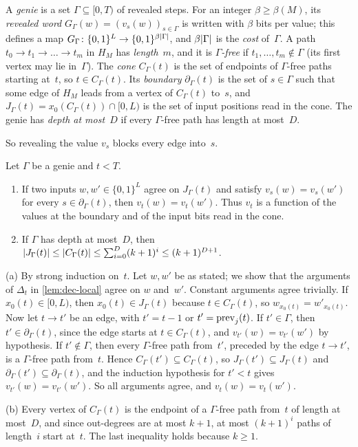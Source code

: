 \begin{definition}\label{def:genie}
A \emph{genie} is a set $\Gamma\subseteq[0,T)$ of revealed steps. For an integer $\beta\ge\beta(M)$, its
\emph{revealed word} $G_\Gamma(w)=(v_s(w))_{s\in\Gamma}$ is written with $\beta$ bits per value; this defines a map
$G_\Gamma\colon\{0,1\}^L\to\{0,1\}^{\beta\lvert \Gamma \rvert}$, and $\beta\lvert \Gamma \rvert$ is the \emph{cost} of~$\Gamma$. A path
$t_0\to t_1\to\dots\to t_m$ in $H_M$ has \emph{length}~$m$, and it is \emph{$\Gamma$-free} if
$t_1,\dots,t_m\notin\Gamma$ (its first vertex may lie in~$\Gamma$). The \emph{cone} $C_\Gamma(t)$ is the set of
endpoints of $\Gamma$-free paths starting at~$t$, so $t\in C_\Gamma(t)$. Its \emph{boundary} $\partial_\Gamma(t)$ is
the set of $s\in\Gamma$ such that some edge of $H_M$ leads from a vertex of $C_\Gamma(t)$ to~$s$, and
$J_\Gamma(t)=x_0(C_\Gamma(t))\cap[0,L)$ is the set of input positions read in the cone. The genie has \emph{depth at
most~$D$} if every $\Gamma$-free path has length at most~$D$.
\end{definition}

So revealing the value $v_s$ blocks every edge into~$s$.

\begin{lemma}\label{lem:cone}
\notformalized
Let $\Gamma$ be a genie and $t<T$.
\begin{enumerate}[label=(\alph*)]
\item If two inputs $w,w'\in\{0,1\}^L$ agree on $J_\Gamma(t)$ and satisfy $v_s(w)=v_s(w')$ for every
$s\in\partial_\Gamma(t)$, then $v_t(w)=v_t(w')$. Thus $v_t$ is a function of the values at the boundary and of the
input bits read in the cone.
\item If $\Gamma$ has depth at most~$D$, then
$\lvert J_\Gamma(t) \rvert\le\lvert C_\Gamma(t) \rvert\le\sum_{i=0}^{D}(k+1)^i\le(k+1)^{D+1}$.
\end{enumerate}
\end{lemma}

\begin{informalproof}
(a) By strong induction on~$t$. Let $w,w'$ be as stated; we show that the arguments of $\Delta_t$ in
\cref{lem:dec-local} agree on $w$ and~$w'$. Constant arguments agree trivially. If $x_0(t)\in[0,L)$, then
$x_0(t)\in J_\Gamma(t)$ because $t\in C_\Gamma(t)$, so $w_{x_0(t)}=w'_{x_0(t)}$. Now let $t\to t'$ be an edge, with
$t'=t-1$ or $t'=\mathrm{prev}_j(t)$. If $t'\in\Gamma$, then $t'\in\partial_\Gamma(t)$, since the edge starts at
$t\in C_\Gamma(t)$, and $v_{t'}(w)=v_{t'}(w')$ by hypothesis. If $t'\notin\Gamma$, then every $\Gamma$-free path
from~$t'$, preceded by the edge $t\to t'$, is a $\Gamma$-free path from~$t$. Hence $C_\Gamma(t')\subseteq C_\Gamma(t)$,
so $J_\Gamma(t')\subseteq J_\Gamma(t)$ and $\partial_\Gamma(t')\subseteq\partial_\Gamma(t)$, and the induction
hypothesis for $t'<t$ gives $v_{t'}(w)=v_{t'}(w')$. So all arguments agree, and $v_t(w)=v_t(w')$.

(b) Every vertex of $C_\Gamma(t)$ is the endpoint of a $\Gamma$-free path from~$t$ of length at most~$D$, and since
out-degrees are at most $k+1$, at most $(k+1)^i$ paths of length~$i$ start at~$t$. The last inequality holds because
$k\ge1$.
\end{informalproof}

